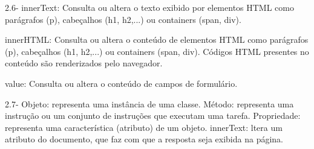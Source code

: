 2.6- innerText: Consulta ou altera o texto exibido por elementos HTML como parágrafos (p),
cabeçalhos (h1, h2,...) ou containers (span, div).

innerHTML: Consulta ou altera o conteúdo de elementos HTML como parágrafos (p), cabeçalhos
(h1, h2,...) ou containers (span, div). Códigos HTML presentes no conteúdo são
renderizados pelo navegador.

value: Consulta ou altera o conteúdo de campos de formulário.

2.7- Objeto: representa uma instância de uma classe.
Método: representa uma instrução ou um conjunto de instruções que executam uma tarefa.
Propriedade: representa uma característica (atributo) de um objeto.
innerText: ltera um atributo do documento, que faz com que a resposta seja exibida na página.

